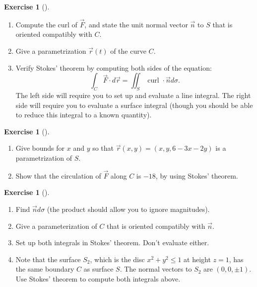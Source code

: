 \documentclass[10pt,]{book}
\theoremstyle{plain}
\theoremstyle{definition}
\theoremstyle{definition}
\theoremstyle{definition}
\theoremstyle{definition}
\newtheorem{exploration}[project]{Exercise}
\theoremstyle{definition}
\numberwithin{equation}{section}
\begin{document}
\begin{exploration}[]\label{exploration-291}
\leavevmode%
\begin{enumerate}[font=\bfseries,label=(\alph*),ref=\alph*]
\item\label{task-794} Compute the curl of \(\vec F\), and state the unit normal vector \(\vec n\) to \(S\) that is oriented compatibly with \(C\).%
\item\label{task-795} Give a parametrization \(\vec r(t)\) of the curve \(C\).%
\item\label{task-796} Verify Stokes' theorem by computing both sides of the equation:%
\begin{equation*}
\int_C\vec F\cdot d\vec r = \iint_S \text{ curl } \cdot \vec n d\sigma.
\end{equation*}
The left side will require you to set up and evaluate a line integral.  The right side will require you to evaluate a surface integral (though you should be able to reduce this integral to a known quantity).%
\end{enumerate}
\end{exploration}
\begin{exploration}[]\label{exploration-292}
\leavevmode%
\begin{enumerate}[font=\bfseries,label=(\alph*),ref=\alph*]
\item\label{task-797} Give bounds for \(x\) and \(y\) so that \(\vec r(x,y)=(x,y,6-3x-2y)\) is a parametrization of \(S\).%
\item\label{task-798} Show that the circulation of \(\vec F\) along \(C\) is \(-18\), by using Stokes' theorem.%
\end{enumerate}
\end{exploration}
\begin{exploration}[]\label{exploration-293}
\leavevmode%
\begin{enumerate}[font=\bfseries,label=(\alph*),ref=\alph*]
\item\label{task-799} Find \(\vec n d\sigma\) (the product should allow you to ignore magnitudes).%
\item\label{task-800} Give a parameterization of \(C\) that is oriented compatibly with \(\vec n\).%
\item\label{task-801} Set up both integrals in Stokes' theorem. Don't evaluate either.%
\item\label{task-802} Note that the surface \(S_2\), which is the disc \(x^2+y^2\leq 1\) at height \(z=1\), has the same boundary \(C\) as surface \(S\). The normal vectors to \(S_2\) are \((0,0,\pm 1)\). Use Stokes' theorem to compute both integrals above.%
\end{enumerate}
\end{exploration}
\end{document}
